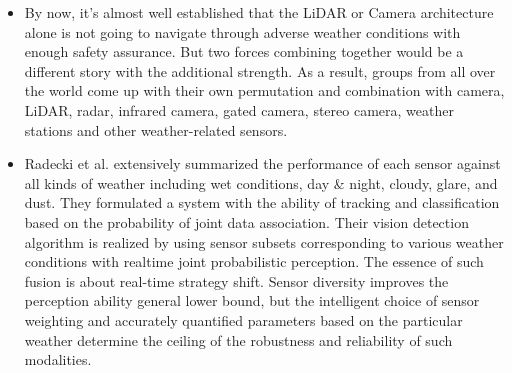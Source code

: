 \documentclass[rnd]{mas_proposal}
\begin{document}
\begin{itemize}
      \item By now, it’s almost well established that the LiDAR or Camera architecture alone is not going to navigate through adverse weather conditions with enough safety assurance. But two forces combining together would be a different story with the additional strength. As a result, groups from all over the world come up with their own permutation and combination with camera, LiDAR, radar, infrared camera, gated camera, stereo camera, weather stations and other weather-related sensors.

      
      \item Radecki et al. \cite{radecki2016all} extensively summarized the performance of each sensor against all kinds of weather including wet conditions, day \& night, cloudy, glare, and dust. They formulated a system with the ability of tracking and classification based on the probability of joint data association. Their vision detection algorithm is realized by using sensor subsets corresponding to various weather conditions with realtime joint probabilistic perception. The essence of such fusion is about real-time strategy shift. Sensor diversity improves the perception ability general lower bound, but the intelligent choice of sensor weighting and accurately quantified parameters based on the particular weather determine the ceiling of the robustness and reliability of such modalities.


\end{itemize}
\end{document}
